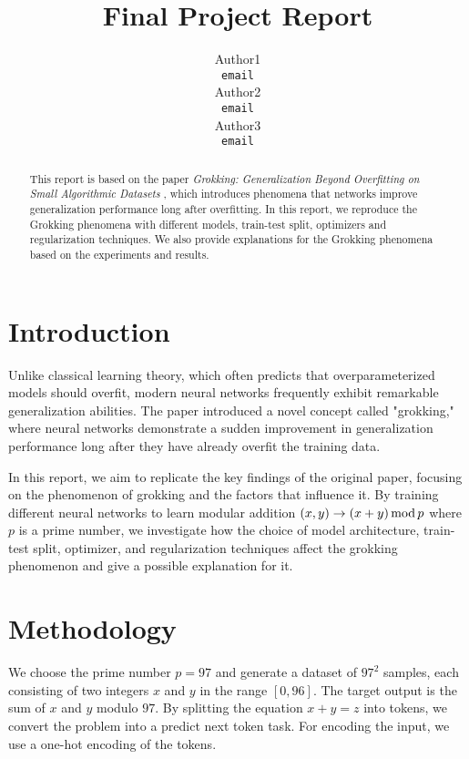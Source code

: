 \documentclass{article}
\title{Final Project Report}
\author{
    Author1 \\
    \texttt{email} \\
    \And
    Author2 \\
    \texttt{email} \\
    \And
    Author3 \\
    \texttt{email} \\
}
\begin{document}
\maketitle

\begin{abstract}
    This report is based on the paper \textit{Grokking: Generalization Beyond Overfitting on Small Algorithmic Datasets} \cite{power2022grokking}, which introduces phenomena that networks improve generalization performance long after overfitting. In this report, we reproduce the Grokking phenomena with different models, train-test split, optimizers and regularization techniques. We also provide explanations for the Grokking phenomena based on the experiments and results.
\end{abstract}

\section{Introduction}

Unlike classical learning theory, which often predicts that overparameterized models should overfit, modern neural networks frequently exhibit remarkable generalization abilities. The paper introduced a novel concept called "grokking," where neural networks demonstrate a sudden improvement in generalization performance long after they have already overfit the training data.

In this report, we aim to replicate the key findings of the original paper, focusing on the phenomenon of grokking and the factors that influence it. By training different neural networks to learn modular addition $(x, y) \rightarrow (x + y)\, {\rm mod}\, p$ where $p$ is a prime number, we investigate how the choice of model architecture, train-test split, optimizer, and regularization techniques affect the grokking phenomenon and give a possible explanation for it.

\section{Methodology}

We choose the prime number $p=97$ and generate a dataset of $97^2$ samples, each consisting of two integers $x$ and $y$ in the range $[0, 96]$. The target output is the sum of $x$ and $y$ modulo $97$. By splitting the equation $x + y = z$ into tokens, we convert the problem into a predict next token task. For encoding the input, we use a one-hot encoding of the tokens.
\end{document}
